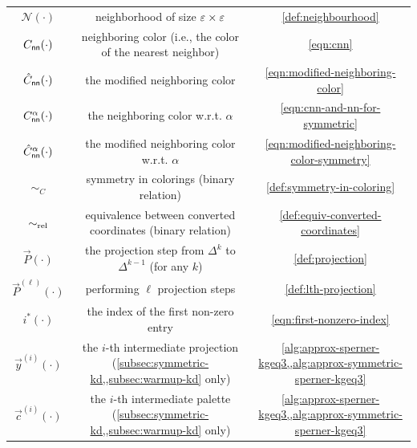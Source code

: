 \begin{table}[h]
\begin{tabular}{c|c|c}
        $\mathcal{N}(\cdot)$ & neighborhood of size $\varepsilon\times \varepsilon$ & \cref{def:neighbourhood} \\
        $C_{\sf nn}(\cdot)$ & neighboring color (i.e., the color of the nearest neighbor) & \cref{eqn:cnn}\\
        $\hat{C}_{\sf nn}(\cdot)$ & the modified neighboring color & \cref{eqn:modified-neighboring-color}\\
        $C_{\sf nn}^{\alpha}(\cdot)$ &  the neighboring color w.r.t. $\alpha$ & \cref{eqn:cnn-and-nn-for-symmetric}\\
        $\hat{C}_{\sf nn}^{\alpha}(\cdot)$ &  the modified neighboring color w.r.t. $\alpha$ & \cref{eqn:modified-neighboring-color-symmetry}\\
        $\sim_C$ & symmetry in colorings (binary relation) & \cref{def:symmetry-in-coloring} \\
        $\operatorname*{\sim_{\rm rel}}$ & equivalence between converted coordinates (binary relation) & \cref{def:equiv-converted-coordinates}\\
        $\vec{P}(\cdot)$ & the projection step from $\Delta^{k}$ to $\Delta^{k-1}$ (for any $k$) & \cref{def:projection}\\
        $\vec{P}^{(\ell)}(\cdot)$ & performing $\ell$ projection steps & \cref{def:lth-projection}\\
        $i^*(\cdot)$ & the index of the first non-zero entry & \cref{eqn:first-nonzero-index}\\
        $\vec{y}^{(i)}(\cdot)$ & the $i$-th intermediate projection (\cref{subsec:symmetric-kd,,subsec:warmup-kd} only) & \cref{alg:approx-sperner-kgeq3,,alg:approx-symmetric-sperner-kgeq3} \\
        $\vec{c}^{(i)}(\cdot)$ & the $i$-th intermediate palette (\cref{subsec:symmetric-kd,,subsec:warmup-kd} only) & \cref{alg:approx-sperner-kgeq3,,alg:approx-symmetric-sperner-kgeq3} \\
        \hline
    \end{tabular} \label{table:notation}
\end{table}